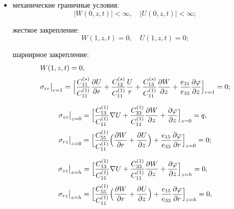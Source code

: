 \begin{itemize}
\item механические граничные условия:
\begin{equation}
\label{shlya:eq2}
|W( 0,z,t )|<\infty, \quad |U(0,z,t)|<\infty;
\end{equation}

жесткое закрепление: 
\begin{equation}
\label{shlya:eq3}
W(1,z,t)=0,\quad U(1,z,t)=0;
\end{equation}

шарнирное закрепление: 
\begin{equation}
\label{shlya:eq4}
\begin{array}{l}
W(1,z,t)=0,
\\[2mm]
\displaystyle 
\sigma _{rr} \big|_{r=1} =\Bigl[ \frac{C_{11}^{( s )} }{C_{11}^{( 1 
)} }\frac{\partial U}{\partial r}+\frac{C_{12}^{( s )} 
}{C_{11}^{( 1 )} }\frac{U}{r}+\frac{C_{13}^{( s )} 
}{C_{11}^{( 1 )} }\frac{\partial W}{\partial z}+\frac{e_{31} 
}{e_{33} }\frac{\partial \varphi }{\partial z}\Bigr]_{r=1} =0;
\end{array}
\end{equation}

\begin{equation}
\label{shlya:eq5}
\begin{array}{l}
\displaystyle
\sigma _{zz}\big|_{z=0} =
\Bigl[ \frac{C_{13}^{( 1 )} }{C_{11}^{( 1 )} 
}\nabla U+\frac{C_{33}^{( 1 )} }{C_{11}^{( 1 )} 
}\frac{\partial W}{\partial z}+\frac{\partial \varphi }{\partial z} 
\Bigr]_{z=0}
=q,
\\[5mm]
\displaystyle
\sigma _{rz}\big|_{z=0} =
\Bigl[
\frac{C_{55}^{( 1 )} }{C_{11}^{( 1 )} 
}\Bigl( \frac{\partial W}{\partial r}+\frac{\partial U}{\partial z}\Bigr)
+\frac{e_{15} }{e_{33} }\frac{\partial \varphi }{\partial r}
\Bigr]_{z=0}
=0;
\end{array}
\end{equation}

\begin{equation}
\label{shlya:eq7}
\begin{array}{l}
\displaystyle
\sigma _{zz}\big|_{z=h} =
\Bigl[\frac{C_{13}^{( 1 )} }{C_{11}^{( 1 )} 
}\nabla U+\frac{C_{33}^{( 1 )} }{C_{11}^{( 1 )} 
}\frac{\partial W}{\partial z}+\frac{\partial \varphi }{\partial z}\Bigr]_{z=h}=0,
\\[5mm]
\displaystyle
\sigma _{rz}\big|_{z=h} =
\Bigl[
\frac{C_{55}^{( 1 )} }{C_{11}^{( 1 )} }
\Bigl(
\frac{\partial W}{\partial r}+\frac{\partial U}{\partial z}\Bigr) +\frac{e_{15} }{e_{33} }\frac{\partial \varphi }{\partial r}
\Bigr]_{z=h}
=0,
\end{array}
\end{equation}


\end{itemize}
